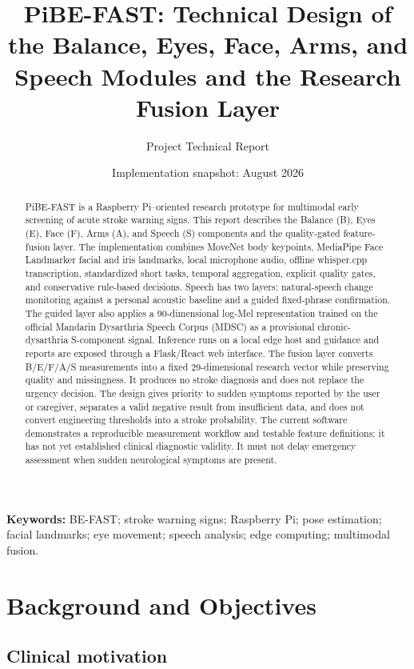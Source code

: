 \documentclass[11pt,a4paper]{article}
\title{\textbf{PiBE-FAST: Technical Design of the Balance, Eyes, Face, Arms, and Speech Modules and the Research Fusion Layer}}
\author{Project Technical Report}
\date{Implementation snapshot: August 2026}
\begin{document}
\maketitle

\begin{abstract}
PiBE-FAST is a Raspberry Pi--oriented research prototype for multimodal early screening of acute stroke warning signs. This report describes the Balance (B), Eyes (E), Face (F), Arms (A), and Speech (S) components and the quality-gated feature-fusion layer. The implementation combines MoveNet body keypoints, MediaPipe Face Landmarker facial and iris landmarks, local microphone audio, offline whisper.cpp transcription, standardized short tasks, temporal aggregation, explicit quality gates, and conservative rule-based decisions. Speech has two layers: natural-speech change monitoring against a personal acoustic baseline and a guided fixed-phrase confirmation. The guided layer also applies a 90-dimensional log-Mel representation trained on the official Mandarin Dysarthria Speech Corpus (MDSC) as a provisional chronic-dysarthria S-component signal. Inference runs on a local edge host and guidance and reports are exposed through a Flask/React web interface. The fusion layer converts B/E/F/A/S measurements into a fixed 29-dimensional research vector while preserving quality and missingness. It produces no stroke diagnosis and does not replace the urgency decision. The design gives priority to sudden symptoms reported by the user or caregiver, separates a valid negative result from insufficient data, and does not convert engineering thresholds into a stroke probability. The current software demonstrates a reproducible measurement workflow and testable feature definitions; it has not yet established clinical diagnostic validity. It must not delay emergency assessment when sudden neurological symptoms are present.
\end{abstract}

\textbf{Keywords:} BE-FAST; stroke warning signs; Raspberry Pi; pose estimation; facial landmarks; eye movement; speech analysis; edge computing; multimodal fusion.

\tableofcontents
\newpage

\section{Background and Objectives}

\subsection{Clinical motivation}
\end{document}
